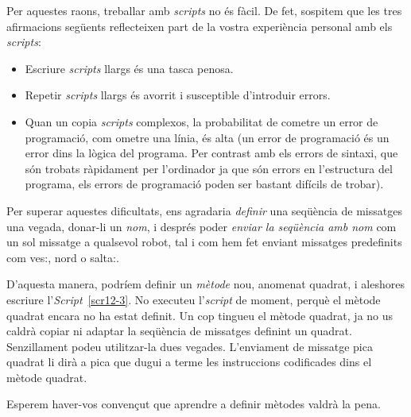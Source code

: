 Per aquestes raons, treballar amb \emph{scripts} no és fàcil. De fet, sospitem que les tres afirmacions següents reflecteixen part de la vostra experiència personal amb els \emph{scripts}:
\begin{itemize}
\item Escriure \emph{scripts} llargs és una tasca penosa.
\item Repetir \emph{scripts} llargs és avorrit i susceptible d'introduir errors.
\item Quan un copia \emph{scripts} complexos, la probabilitat de cometre un error de programació, com ometre una línia, és alta (un error de programació és un error dins la lògica del programa. Per contrast amb els errors de sintaxi, que són trobats ràpidament per l'ordinador ja que són errors en l'estructura del programa, els errors de programació poden ser bastant difícils de trobar).
\end{itemize}

Per superar aquestes dificultats, ens agradaria \emph{definir} una seqüència de missatges una vegada, donar-li un \emph{nom}, i després poder \emph{enviar la seqüència amb nom} com un sol missatge a qualsevol robot, tal i com hem fet enviant missatges predefinits com \textsf{ves:}, \textsf{nord} o \textsf{salta:}.

D'aquesta manera, podríem definir un \emph{mètode} nou, anomenat \textsf{quadrat}, i aleshores escriure l'\emph{Script}~\ref{scr12-3}. No executeu l'\emph{script} de moment, perquè el mètode \textsf{quadrat} encara no ha estat definit. Un cop tingueu el mètode \textsf{quadrat}, ja no us caldrà copiar ni adaptar la seqüència de missatges definint un quadrat. Senzillament podeu utilitzar-la dues vegades. L'enviament de missatge \textsf{pica quadrat} li dirà a \textsf{pica} que dugui a terme les instruccions codificades dins el mètode \textsf{quadrat}.

Esperem haver-vos convençut que aprendre a definir mètodes valdrà la pena.

